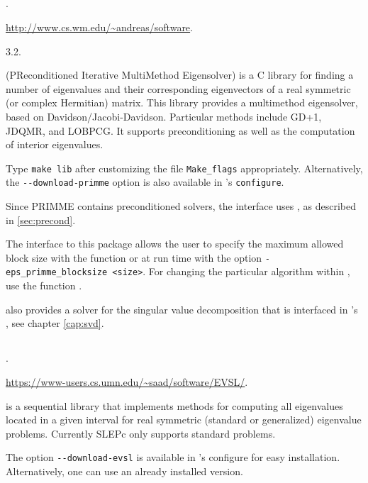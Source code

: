 \subsection*{\underline{\primme}}
	\begin{description}
	\setlength{\itemsep}{0pt}
	\item[References.]\citep{Stathopoulos:2010:PMS}.
	\item[Website.] \url{http://www.cs.wm.edu/~andreas/software}.
	\item[Version.] 3.2.
	\item[Summary.] \primme (PReconditioned Iterative MultiMethod Eigensolver) is a C library for finding a number of eigenvalues and their corresponding eigenvectors of a real symmetric (or complex Hermitian) matrix. This library provides a multimethod eigensolver, based on Davidson/Jacobi-Davidson. Particular methods include GD+1, JDQMR, and LOBPCG. It supports preconditioning as well as the computation of interior eigenvalues.
	\item[Installation.] Type \texttt{make lib} after customizing the file \texttt{Make\_flags} appropriately. Alternatively, the \texttt{-{}-download-primme} option is also available in \slepc's \texttt{configure}.
	\item[Specific options.] Since PRIMME contains preconditioned solvers, the \slepc interface uses , as described in \ref{sec:precond}.

The \slepc interface to this package allows the user to specify the maximum allowed block size with the function  or at run time with the option \Verb!-eps_primme_blocksize <size>!.
For changing the particular algorithm within \primme, use the function .

\primme also provides a solver for the singular value decomposition that is interfaced in \slepc's , see chapter \ref{cap:svd}.
	\end{description}

\subsection*{\underline{\evsl}}
	\begin{description}
	\setlength{\itemsep}{0pt}
	\item[References.]\citep{Li:2019:EVS}.
	\item[Website.] \url{https://www-users.cs.umn.edu/~saad/software/EVSL/}.
	\item[Summary.] \evsl is a sequential library that implements methods for computing all eigenvalues located in a given interval for real symmetric (standard or generalized) eigenvalue problems. Currently SLEPc only supports standard problems.
	\item[Installation.] The option \texttt{-{}-download-evsl} is available in \slepc's configure for easy installation. Alternatively, one can use an already installed version.
	\end{description}

